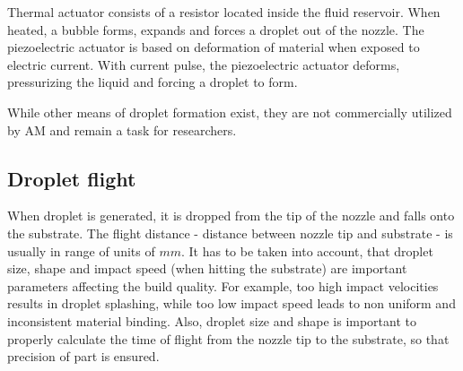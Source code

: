 \documentclass[a4paper, twoside, 11pt]{report}
\begin{document}
	Thermal actuator consists of a resistor located inside the fluid reservoir. When heated, a bubble forms, expands and forces a droplet out of the nozzle. The piezoelectric actuator is based on deformation of material when exposed to electric current. With current pulse, the piezoelectric actuator deforms, pressurizing the liquid and forcing a droplet to form.

	While other means of droplet formation exist, they are not commercially utilized by AM and remain a task for researchers.

\subsection{Droplet flight}
When droplet is generated, it is dropped from the tip of the nozzle and falls onto the substrate. The flight distance - distance between nozzle tip and substrate - is usually in range of units of $mm$. It has to be taken into account, that droplet size, shape and impact speed (when hitting the substrate) are important parameters affecting the build quality. For example, too high impact velocities results in droplet splashing, while too low impact speed leads to non uniform and inconsistent material binding. Also, droplet size and shape is important to properly calculate the time of flight from the nozzle tip to the substrate, so that precision of part is ensured.
\end{document}
